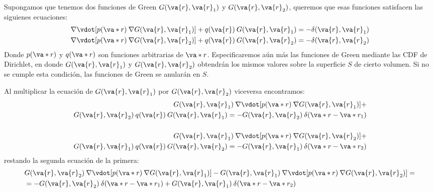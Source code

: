 \par
Supongamos que tenemos dos funciones de Green $G(\va{r}, \va{r}_{1})$ y $G(\va{r}, \va{r}_{2})$, queremos que esas funciones satisfacen las siguienes ecuaciones:
\begin{align}
\nabla \vdot [ p(\va*{r}) \: \nabla G(\va{r}, \va{r}_{1}) ] + q(\va{r}) \: G(\va{r}, \va{r}_{1}) &= - \delta(\va{r}, \va{r}_{1}) \label{eq:ecuacion_14} \\
\nabla \vdot [ p(\va*{r}) \: \nabla G(\va{r}, \va{r}_{2}) ] + q(\va{r}) \: G(\va{r}, \va{r}_{2}) &= - \delta(\va{r}, \va{r}_{2}) \label{eq:ecuacion_15}
\end{align}
Donde $p(\va*{r})$ y $q(\va*{r})$ son funciones arbitrarias de $\va*{r}$.
Especificaremos aún más las funciones de Green mediante las CDF  de Dirichlet, en  donde $G(\va{r}, \va{r}_{1})$ y $G(\va{r}, \va{r}_{2})$ obtendrán los mismos valores sobre la superficie $S$ de cierto volumen. Si no se cumple esta condición, las funciones de Green se anularán en $S$.
\par
Al multiplicar la ecuación de $G(\va{r}, \va{r}_{1})$ por $G(\va{r}, \va{r}_{2})$ viceversa encontramos:
\begin{align}
G(\va{r}, \va{r}_{1})  \: \nabla \vdot [ p(\va*{r}) \: \nabla G(\va{r}, \va{r}_{1})] + \label{eq:ecuacion_16} \\
G(\va{r}, \va{r}_{2})  \: q(\va{r}) \: G(\va{r}, \va{r}_{1}) = -  G(\va{r}, \va{r}_{2}) \: \delta(\va*{r} - \va*{r}_{1})  \label{eq:ecuacion_17} \\
\nonumber \\
G(\va{r}, \va{r}_{1})  \: \nabla \vdot [ p(\va*{r}) \: \nabla G(\va{r}, \va{r}_{2})] + \label{eq:ecuacion_18} \\
G(\va{r}, \va{r}_{1})  \: q(\va{r}) \: G(\va{r}, \va{r}_{2}) = -  G(\va{r}, \va{r}_{1}) \: \delta(\va*{r} - \va*{r}_{2})  \label{eq:ecuacion_19}
\end{align}
restando la segunda ecuación de la primera:
\begin{align}
&G(\va{r}, \va{r}_{2})  \: \nabla \vdot [ p(\va*{r}) \: \nabla G(\va{r}, \va{r}_{1})] - G(\va{r}, \va{r}_{1})  \: \nabla \vdot [ p(\va*{r}) \: \nabla G(\va{r}, \va{r}_{2})] = \label{eq:ecuacion_20} \\ 
&= - G(\va{r}, \va{r}_{2}) \: \delta(\va*{r} - \va*{r}_{1}) + G(\va{r}, \va{r}_{1}) \: \delta(\va*{r} - \va*{r}_{2}) \label{eq:ecuacion_21}
\end{align}
